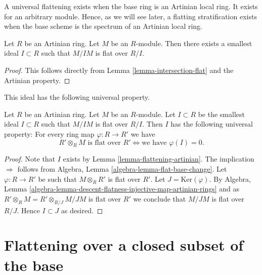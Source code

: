 \noindent
A universal flattening exists when the base ring is an Artinian local
ring. It exists for an arbitrary module. Hence, as we will see later,
a flatting stratification exists when the base scheme is the spectrum
of an Artinian local ring.

\begin{lemma}
\label{lemma-flattening-artinian}
Let $R$ be an Artinian ring.
Let $M$ be an $R$-module.
Then there exists a smallest ideal $I \subset R$ such that
$M/IM$ is flat over $R/I$.
\end{lemma}

\begin{proof}
This follows directly from
Lemma \ref{lemma-intersection-flat}
and the Artinian property.
\end{proof}

\noindent
This ideal has the following universal property.

\begin{lemma}
\label{lemma-flattening-artinian-universal-property}
Let $R$ be an Artinian ring. Let $M$ be an $R$-module.
Let $I \subset R$ be the smallest ideal $I \subset R$ such that
$M/IM$ is flat over $R/I$.
Then $I$ has the following universal property:
For every ring map $\varphi : R \to R'$ we have
$$
R' \otimes_R M\text{ is flat over }R'
\Leftrightarrow
\text{we have }\varphi(I) = 0.
$$
\end{lemma}

\begin{proof}
Note that $I$ exists by
Lemma \ref{lemma-flattening-artinian}.
The implication $\Rightarrow$ follows from
Algebra, Lemma \ref{algebra-lemma-flat-base-change}.
Let $\varphi : R \to R'$ be such that $M \otimes_R R'$ is flat over $R'$.
Let $J = \text{Ker}(\varphi)$. By
Algebra,
Lemma \ref{algebra-lemma-descent-flatness-injective-map-artinian-rings}
and as $R' \otimes_R M = R' \otimes_{R/J} M/JM$ is
flat over $R'$ we conclude that $M/JM$ is flat over $R/J$.
Hence $I \subset J$ as desired.
\end{proof}











\section{Flattening over a closed subset of the base}
\label{section-flattening-local-base}


